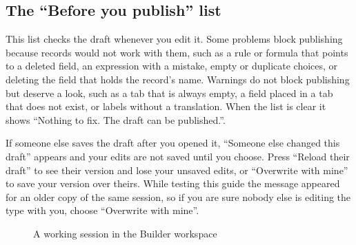 \subsection{The “Before you publish” list}

This list checks the draft whenever you edit it. Some problems block publishing because records would not work with them, such as a rule or formula that points to a deleted field, an expression with a mistake, empty or duplicate choices, or deleting the field that holds the record's name. Warnings do not block publishing but deserve a look, such as a tab that is always empty, a field placed in a tab that does not exist, or labels without a translation. When the list is clear it shows “Nothing to fix. The draft can be published.”.

\begin{rcwarn}
If someone else saves the draft after you opened it, “Someone else changed this draft” appears and your edits are not saved until you choose. Press “Reload their draft” to see their version and lose your unsaved edits, or “Overwrite with mine” to save your version over theirs. While testing this guide the message appeared for an older copy of the same session, so if you are sure nobody else is editing the type with you, choose “Overwrite with mine”.
\end{rcwarn}

\begin{figure}[H]
\centering
{}
\rclegend
\caption{A working session in the Builder workspace}
\label{fig:builder-workspace-flow}
\end{figure}

